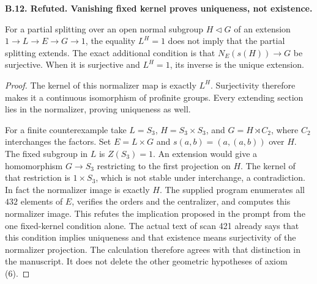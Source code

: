 \documentclass[11pt,oneside]{article}
\makeatletter
\newcounter{statementanchor}
\newenvironment{statement}[3]{%
 \refstepcounter{statementanchor}\def\@currentlabel{#1}%
 \par\addvspace{9pt}\noindent
 \textbf{#1. #2. #3.}\par\nobreak\noindent\ignorespaces
}{\par\addvspace{5pt}}
\makeatother
\begin{document}
\begin{statement}{B.12}{Refuted}{Vanishing fixed kernel proves uniqueness, not existence}
\label{st:B.12}

For a partial splitting over an open normal subgroup $H\triangleleft G$
of an extension $1\to L\to E\to G\to1$, the equality $L^H=1$
does not imply that the partial splitting extends.  The exact
additional condition is that $N_E(s(H))\to G$ be surjective.
When it is surjective and $L^H=1$, its inverse is the unique extension.
\end{statement}
\begin{proof}
The kernel of this normalizer map is exactly $L^H$.
Surjectivity therefore makes it a continuous isomorphism of profinite
groups.  Every extending section lies in the normalizer, proving
uniqueness as well.

For a finite counterexample take
$L=S_3$, $H=S_3\times S_3$, and
$G=H\rtimes C_2$, where $C_2$ interchanges the factors.
Set $E=L\times G$ and $s(a,b)=(a,(a,b))$ over $H$.
The fixed subgroup in $L$ is $Z(S_3)=1$.
An extension would give a homomorphism $G\to S_3$ restricting to the
first projection on $H$.  The kernel of that restriction is
$1\times S_3$, which is not stable under interchange, a contradiction.
In fact the normalizer image is exactly $H$.
The supplied program enumerates all $432$ elements of $E$, verifies
the orders and the centralizer, and computes this normalizer image.
This refutes the implication proposed in the prompt from the
one fixed-kernel condition alone. The actual text of scan 421
already says that this condition implies uniqueness and that
existence means surjectivity of the normalizer projection.
The calculation therefore agrees with that distinction in
the manuscript. It does not delete the other geometric
hypotheses of axiom (6).
\end{proof}
\end{document}
